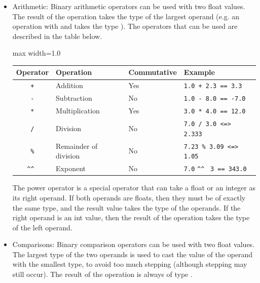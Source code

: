\begin{itemize}
  \setlength\itemsep{-4pt}
\item Arithmetic: Binary arithmetic operators can be used with two float values.
  The result of the operation takes the type of the largest operand (e.g. an
  operation with  and  takes the type ). The
  operators that can be used are described in the table below.

  \begin{center}
    \begin{adjustbox}{max width=1.0\linewidth}
      \begin{tabular}{|c|lll|}
        \hline
        Operator & Operation & Commutative & Example\\[0pt]
        \hline
        \hline
        \texttt{+} & Addition & Yes & \texttt{1.0 + 2.3 == 3.3}\\[0pt]
        \texttt{-} & Subtraction & No & \texttt{1.0 - 8.0 == -7.0}\\[0pt]
        \texttt{*} & Multiplication & Yes & \texttt{3.0 * 4.0 == 12.0}\\[0pt]
        \texttt{/} & Division & No & \texttt{7.0 / 3.0 <=> 2.333}\\[0pt]
        \texttt{\%} & Remainder of division & No & \texttt{7.23 \% 3.09 <=> 1.05}\\[0pt]
        \verb~^^~ & Exponent & No & \texttt{7.0} \verb~^^~ \texttt{3 == 343.0}\\[0pt]
        \hline
      \end{tabular}
    \end{adjustbox}
  \end{center}

  The power operator \token{\^\^} is a special
  operator that can take a float or an integer as its right operand. If both
  operands are floats, then they must be of exactly the same type, and the
  result value takes the type of the operands. If the right operand is an int
  value, then the result of the operation takes the type of the left operand.

\item Comparisons: Binary comparison operators can be used with two float values. The
  largest type of the two operands is used to cast the value of the operand with
  the smallest type, to avoid too much stepping (although stepping may still
  occur). The result of the operation is always of type .


\end{itemize}
